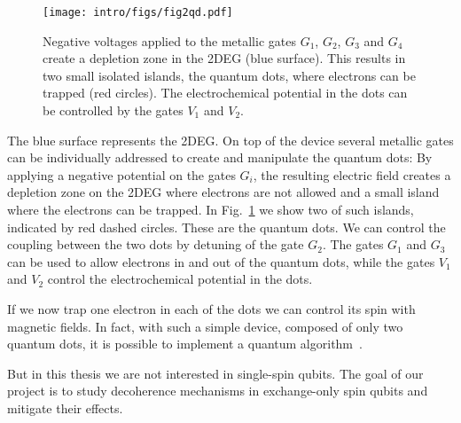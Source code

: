 \begin{figure}
  \centering
  \texttt{[image: intro/figs/fig2qd.pdf]}
  \caption{ Negative voltages applied to the metallic gates $G_1$, $G_2$, $G_3$ and $G_4$ create a depletion zone in the 2DEG (blue surface). This results in two small isolated islands, the quantum dots, where electrons can be trapped (red circles). The electrochemical potential in the dots can be controlled by the gates $V_1$ and $V_2$. \label{fig1:2qd}}
\end{figure}
The blue surface represents the 2DEG. On top of the device several metallic gates can be individually addressed to create and manipulate the quantum dots: By applying a negative potential on the gates $G_i$, the resulting electric field creates a depletion zone on the 2DEG where electrons are not allowed and a small island where the electrons can be trapped. In Fig.~\ref{fig1:2qd} we show two of such islands, indicated by red dashed circles. These are the quantum dots. We can control the coupling between the two dots by detuning of the gate $G_2$. The gates $G_1$ and $G_3$ can be used to allow electrons in and out of the quantum dots, while the gates $V_1$ and $V_2$ control the electrochemical potential in the dots.

If we now trap one electron in each of the dots we can control its spin with magnetic fields. In fact, with such a simple device, composed of only two quantum dots, it is possible to implement a quantum algorithm~\cite{Watson2018}.

But in this thesis we are not interested in single-spin qubits. The goal of our project is to study decoherence mechanisms in exchange-only spin qubits and mitigate their effects.


